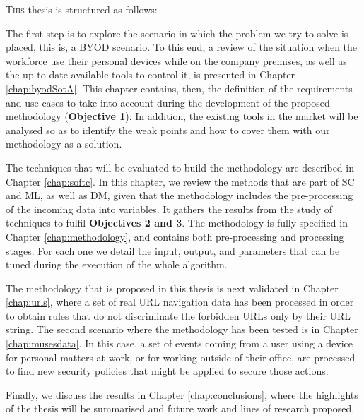 
\lettrine{T}{his} thesis is structured as follows:

The first step is to explore the scenario in which the problem we try to solve is placed, this is, a BYOD scenario. To this end, a review of the situation when the workforce use their personal devices while on the company premises, as well as the up-to-date available tools to control it, is presented in Chapter \ref{chap:byodSotA}. This chapter contains, then, the definition of the requirements and use cases to take into account during the development of the proposed methodology (\textbf{Objective 1}). In addition, the existing tools in the market will be analysed so as to identify the weak points and how to cover them with our methodology as a solution.

The techniques that will be evaluated to build the methodology are described in Chapter \ref{chap:softc}. In this chapter, we review the methods that are part of SC and ML, as well as DM, given that the methodology includes the pre-processing of the incoming data into variables. It gathers the results from the study of techniques to fulfil \textbf{Objectives 2 and 3}. The methodology is fully specified in Chapter \ref{chap:methodology}, and contains both pre-processing and processing stages. For each one we detail the input, output, and parameters that can be tuned during the execution of the whole algorithm.

The methodology that is proposed in this thesis is next validated in Chapter \ref{chap:urls}, where a set of real URL navigation data has been processed in order to obtain rules that do not discriminate the forbidden URLs only by their URL string. The second scenario where the methodology has been tested is in Chapter \ref{chap:musesdata}. In this case, a set of events coming from a user using a device for personal matters at work, or for working outside of their office, are processed to find new security policies that might be applied to secure those actions.

Finally, we discuss the results in Chapter \ref{chap:conclusions}, where the highlights of the thesis will be summarised and future work and lines of research proposed.

